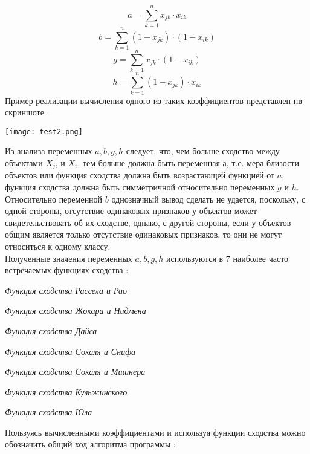 \documentclass[a4paper,12pt]{article}
\begin{document}
\begin{flushleft}
		\begin{equation}
				a = \sum_{k=1}^n x_{jk}\cdot x_{ik}	
		\end{equation}
		\begin{equation}
				b = \sum_{k=1}^n (1 - x_{jk})\cdot(1 - x_{ik})
		\end{equation}
		\begin{equation}
				g = \sum_{k=1}^n x_{jk}\cdot (1 - x_{ik})
		\end{equation}
		\begin{equation}
				h = \sum_{k=1}^n (1 - x_{jk})\cdot x_{ik} 
		\end{equation}
		\medskip
 	Пример реализации вычисления одного из таких коэффициентов представлен нв скриншоте :
 		\begin{center}
			\texttt{[image: test2.png]}
		\end{center}
		Из анализа переменных ${a,b,g,h}$ следует, что, чем больше сходство между объектами ${X_j}$, и ${X_i}$, тем больше должна быть переменная а, т.е. мера близости объектов или функция сходства должна быть возрастающей функцией от ${a}$, функция сходства должна быть симметричной относительно переменных ${g}$ и ${h}$. Относительно переменной ${b}$ однозначный вывод сделать не удается, поскольку, с одной стороны, отсутствие одинаковых признаков у объектов может свидетельствовать об их сходстве, однако, с другой стороны, если у объектов общим является только отсутствие одинаковых признаков, то они не могут относиться к одному классу.
		\\
		\medskip
		Полученные значения переменных ${a,b,g,h}$ используются в 7 наиболее часто встречаемых функциях сходства :
			\begin{list}{}{\leftmargin=3cm}
					\item \textit{Функция сходства Рассела и Рао}
					\item \textit{Функция сходства Жокара и Нидмена}
					\item \textit{Функция сходства Дайса} 
					\item \textit{Функция сходства Сокаля и Снифа}
					\item \textit{Функция сходства Сокаля и Мишнера}
					\item \textit{Функция сходства Кульжинского}
					\item \textit{Функция сходства Юла}
			\end{list}
		Пользуясь вычисленными коэффициентами и используя функции сходства можно 		обозначить общий ход алгоритма программы :	
			\begin{list}{}{\leftmargin=3cm}

\end{list}
\end{flushleft}
\end{document}
